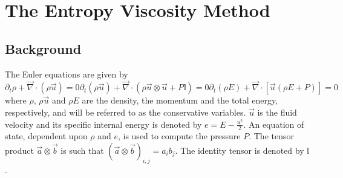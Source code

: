 \documentclass[preprint,10pt]{elsarticle}
\renewcommand{\div}{\vec{\nabla}\! \cdot \!}
\begin{document}
\section{The Entropy Viscosity Method} \label{sec:entro_visc}

\subsection{Background} \label{sec:background}

The Euler equations are given by
\begin{subequations}
\label{eq:euler_eq}
%
\begin{equation}
\partial_t \rho  + \div \left( \rho \vec{u} \right) = 0
\end{equation}
%
\begin{equation}
\partial_t \left( \rho \vec{u} \right) + \div \left( \rho \vec{u} \otimes \vec{u} + P \mathbb{I} \right) = 0 
\end{equation}
%
\begin{equation}
\partial_t \left( \rho E \right) + \div \left[ \vec{u} \left( \rho E + P \right) \right] = 0
\end{equation}
\end{subequations}
%
where $\rho$, $\rho \vec{u}$ and $\rho E$ are the density, the momentum and the total energy, respectively, and will be referred to as the conservative variables. $\vec{u}$ is the fluid velocity and its specific internal energy is denoted by $e=E-\tfrac{u^2}{2}$. An equation of state, dependent upon $\rho$ and $e$, is used to compute the pressure $P$. The tensor product $\vec{a} \otimes \vec{b}$ is such that $(\vec{a} \otimes \vec{b})_{i,j} = a_i b_j$. The identity tensor is denoted by $\mathbb{I}$.
\end{document}
